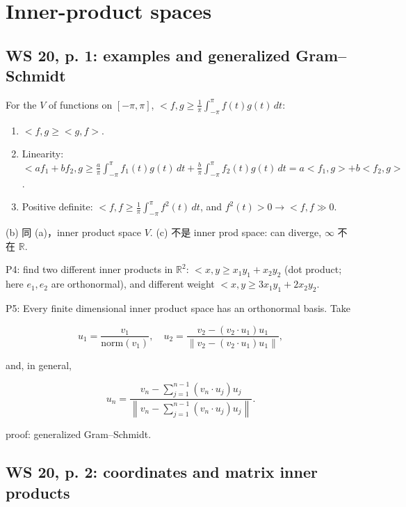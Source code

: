 \chapter{Inner-product spaces}

\section{WS 20, p. 1: examples and generalized Gram--Schmidt}

For the  \(V\) of functions on \(\left\lbrack {- \pi,\pi} \right\rbrack\), \(< f,g \geq \frac{1}{\pi}\int_{- \pi}^{\pi}f(t)g(t)\, dt\):

\begin{enumerate}
\tightlist
\item
  \(< f,g \geq < g,f >\).
\item
  Linearity: \(< af_{1} + bf_{2},g \geq \frac{a}{\pi}\int_{- \pi}^{\pi}f_{1}(t)g(t)\, dt + \frac{b}{\pi}\int_{- \pi}^{\pi}f_{2}(t)g(t)\, dt = a < f_{1},g > + b < f_{2},g >\).
\item
  Positive definite: \(< f,f \geq \frac{1}{\pi}\int_{- \pi}^{\pi}f^{2}(t)\, dt\), and \(f^{2}(t) > 0\rightarrow < f,f \gg 0\).
\end{enumerate}

(b) 同 (a)，inner product space \(V\). (c) 不是 inner prod space: can diverge, \(\infty\) 不在 \(\mathbb{R}\).

P4: find two different inner products in \(\mathbb{R}^{2}\): \(< x,y \geq x_{1}y_{1} + x_{2}y_{2}\) (dot product; here \(e_{1},e_{2}\) are orthonormal), and different weight \(< x,y \geq 3x_{1}y_{1} + 2x_{2}y_{2}\).

P5: Every finite dimensional inner product space has an orthonormal basis. Take

\[u_{1} = \frac{v_{1}}{\text{norm}\left( v_{1} \right)},\quad u_{2} = \frac{v_{2} - \left( {v_{2} \cdot u_{1}} \right)u_{1}}{\left\| {v_{2} - \left( {v_{2} \cdot u_{1}} \right)u_{1}} \right\|},\]

and, in general,

\[u_{n} = \frac{v_{n} - \sum_{j = 1}^{n - 1}\left( {v_{n} \cdot u_{j}} \right)u_{j}}{\left\| {v_{n} - \sum_{j = 1}^{n - 1}\left( {v_{n} \cdot u_{j}} \right)u_{j}} \right\|}.\]

proof: generalized Gram--Schmidt.

\section{WS 20, p. 2: coordinates and matrix inner products}

